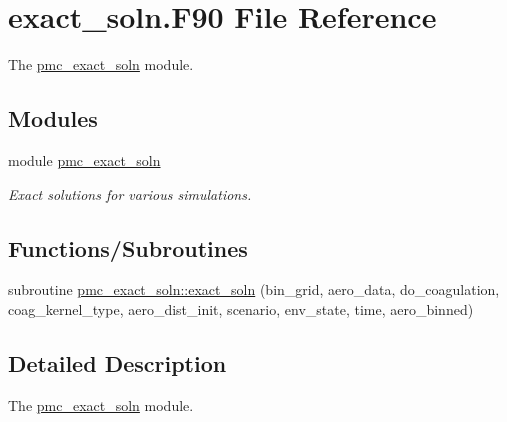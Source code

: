 \hypertarget{exact__soln_8_f90}{}\section{exact\+\_\+soln.\+F90 File Reference}
\label{exact__soln_8_f90}


The \mbox{\hyperlink{namespacepmc__exact__soln}{pmc\+\_\+exact\+\_\+soln}} module.  


\subsection*{Modules}
\begin{DoxyCompactItemize}
\item 
module \mbox{\hyperlink{namespacepmc__exact__soln}{pmc\+\_\+exact\+\_\+soln}}
\begin{DoxyCompactList}\small\item\em Exact solutions for various simulations. \end{DoxyCompactList}\end{DoxyCompactItemize}
\subsection*{Functions/\+Subroutines}
\begin{DoxyCompactItemize}
\item 
subroutine \mbox{\hyperlink{namespacepmc__exact__soln_aa2501f679b533b8505491ecf6a2aa8f1}{pmc\+\_\+exact\+\_\+soln\+::exact\+\_\+soln}} (bin\+\_\+grid, aero\+\_\+data, do\+\_\+coagulation, coag\+\_\+kernel\+\_\+type, aero\+\_\+dist\+\_\+init, scenario, env\+\_\+state, time, aero\+\_\+binned)
\end{DoxyCompactItemize}


\subsection{Detailed Description}
The \mbox{\hyperlink{namespacepmc__exact__soln}{pmc\+\_\+exact\+\_\+soln}} module. 

